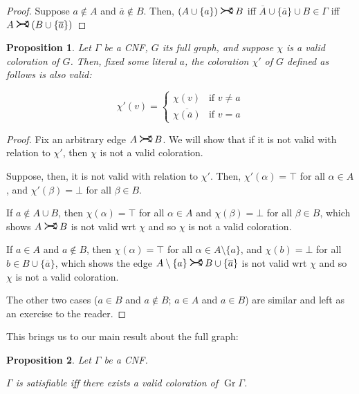 \documentclass[11pt]{article}
\newcommand{\conj}[1]{\overline{#1}}
\DeclareMathOperator{\Gr}{Gr}
\newcommand{\rightcurvearrow}{
\mathrel{
  \begin{tikzpicture}[scale=0.8]
    \draw[thick,->] (0,1ex) arc (30:150:-2ex);
    \draw[thick,->] (0,-1ex) arc (150:30:2ex);
  \end{tikzpicture}
}
}
\newtheorem{prop}{Proposition}
\begin{document}
\begin{proof}
Suppose $a \not\in A$ and $\conj a \not\in B$. Then, $(A \cup \{a\}) \rightcurvearrow B$ iff $\conj A \cup \{\conj a\} \cup B \in \Gamma$ iff $A \rightcurvearrow (B \cup \{\conj a\})$
\end{proof}

\begin{prop} \label{swapvalue}
Let $\Gamma$ be a CNF, $G$ its full graph, and suppose $\chi$ is a valid coloration of $G$. Then, fixed some literal $a$, the coloration $\chi'$ of $G$ defined as follows is also valid:

\[
\chi'(v) =
\begin{cases}
\chi(v) & \text{if $v \neq a$}\\
\conj{\chi(\conj a)} & \text{if $v = a$}
\end{cases}
\]
\end{prop}

\begin{proof}
Fix an arbitrary edge $A \rightcurvearrow B$. We will show that if it is not valid with relation to $\chi'$, then $\chi$ is not a valid coloration.

Suppose, then, it is not valid with relation to $\chi'$. Then, $\chi'(\alpha) = \top$ for all $\alpha \in A$, and $\chi'(\beta) = \bot$ for all $\beta \in B$.

If $a \not \in A \cup B$, then $\chi(\alpha) = \top$ for all $\alpha \in A$ and $\chi(\beta) = \bot$ for all $\beta \in B$, which shows $A \rightcurvearrow B$ is not valid wrt $\chi$ and so $\chi$ is not a valid coloration.

If $a \in A$ and $a \not \in B$, then $\chi(\alpha) = \top$ for all $\alpha \in A \setminus \{a\}$, and $\chi(b) = \bot$ for all $b \in B \cup \{\conj a\}$, which shows the edge $A \setminus \{a\} \rightcurvearrow B \cup \{\conj a\}$ is not valid wrt $\chi$ and so $\chi$ is not a valid coloration.

The other two cases ($a \in B$ and $a \not \in B$; $a \in A$ and $a \in B$) are similar and left as an exercise to the reader.

\end{proof}

This brings us to our main result about the full graph:

\begin{prop}
Let $\Gamma$ be a CNF.

$\Gamma$ is satisfiable iff there exists a valid coloration of $\Gr \Gamma$.
\end{prop}
\end{document}
